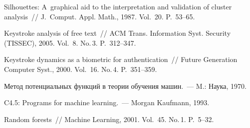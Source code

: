 \begin{multicols}{2}
{{\begin{thebibliography}{99}
 Silhouettes: A~graphical aid to the
interpretation and validation of cluster analysis~// J.~Comput. Appl. Math., 
1987. Vol.~20. P.~53--65.

 Keystroke analysis of free text~//
ACM Trans. Information Syst. Security (TISSEC), 2005.
Vol.~8. No.\,3. P.~312--347.

 Keystroke dynamics as a biometric
for authentication~// Future Generation Computer Syst., 2000.
Vol.~16. No.\,4. P.~351--359.

 Метод потенциальных
функций в теории обучения машин.~--- M.: Наука, 1970.

 C4.5: Programs for machine learning.~--- Morgan Kaufmann, 1993.

\label{end\stat}

 Random forests~// Machine Learning, 2001.
Vol.~45. No.\,1. P.~5--32.
\end{thebibliography}
} }

\end{multicols}